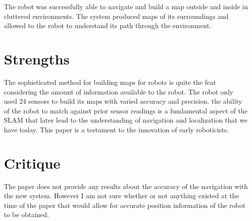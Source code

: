 \documentclass{article}
\begin{document}
The robot was successfully able to navigate and build a map outside and inside in cluttered environments. The system produced maps of its surroundings and allowed to the robot to understand its path through the environment.
\section*{Strengths}
The sophisticated method for building maps for robots is quite the feat considering the amount of information available to the robot. The robot only used 24 sensors to build its maps with varied accuracy and precision. the ability of the robot to match against prior sensor readings is a fundamental aspect of the SLAM that later lead to the understanding of navigation and localization that we have today. This paper is a testament to the innovation of early roboticists.
\section*{Critique}
The paper does not provide any results about the accuracy of the navigation with the new system. However I am not sure whether or not anything existed at the time of the paper that would allow for accurate position information of the robot to be obtained.
\cite{1087096}
\end{document}
